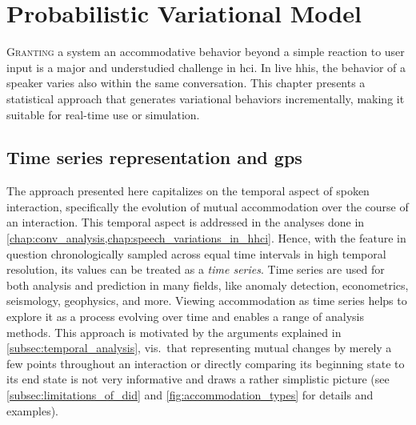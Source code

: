 \chapter{Probabilistic Variational Model}
\label{chap:statistical_model}

\lettrine{G}{ranting} a system an accommodative behavior beyond a simple reaction to user input is a major and understudied challenge in \acs{hci}.
In live \acsp{hhi}, the behavior of a speaker varies also within the same conversation.
This chapter presents a statistical approach that generates variational behaviors incrementally, making it suitable for real-time use or simulation.

\pagebreak

\section{Time series representation and \aclp{gp}}
\label{sec:time_series_analysis}

The approach presented here capitalizes on the temporal aspect of spoken interaction, specifically the evolution of mutual accommodation over the course of an interaction.
This temporal aspect is addressed in the analyses done in \cref{chap:conv_analysis,chap:speech_variations_in_hhci}.
Hence, with the feature in question chronologically sampled across equal time intervals in high temporal resolution, its values can be treated as a \emph{time series}.
Time series are used for both analysis and prediction in many fields, like anomaly detection, econometrics, seismology, geophysics, and more.
Viewing accommodation as time series helps to explore it as a process evolving over time and enables a range of analysis methods.
This approach is motivated by the arguments explained in \cref{subsec:temporal_analysis}, vis.\ that representing mutual changes by merely a few points throughout an interaction or directly comparing its beginning state to its end state is not very informative and draws a rather simplistic picture (see \cref{subsec:limitations_of_did} and \cref{fig:accommodation_types} for details and examples).

